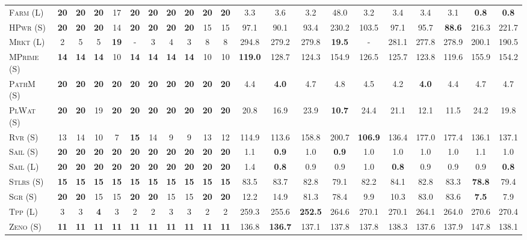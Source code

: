 \documentclass[11pt,landscape]{article}
\begin{document}
\begin{table}[tb]
{\begin{tabular}{|l||cccccccccc||cccccccccc||}
\textsc{Farm} (L)&\textbf{20}&\textbf{20}&\textbf{20}&17&\textbf{20}&\textbf{20}&\textbf{20}&\textbf{20}&\textbf{20}&\textbf{20}&3.3&3.6&3.2&48.0&3.2&3.4&3.4&3.1&\textbf{0.8}&\textbf{0.8}\\
\textsc{HPwr} (S)&\textbf{20}&\textbf{20}&\textbf{20}&14&\textbf{20}&\textbf{20}&\textbf{20}&\textbf{20}&15&15&97.1&90.1&93.4&230.2&103.5&97.1&95.7&\textbf{88.6}&216.3&221.7\\
\textsc{Mrkt} (L)&2&5&5&\textbf{19}&-&3&4&3&8&8&294.8&279.2&279.8&\textbf{19.5}&-&281.1&277.8&278.9&200.1&190.5\\
\textsc{MPrime} (S)&\textbf{14}&\textbf{14}&\textbf{14}&10&\textbf{14}&\textbf{14}&\textbf{14}&\textbf{14}&10&10&\textbf{119.0}&128.7&124.3&154.9&126.5&125.7&123.8&119.6&155.9&154.2\\
\textsc{PathM} (S)&\textbf{20}&\textbf{20}&\textbf{20}&\textbf{20}&\textbf{20}&\textbf{20}&\textbf{20}&\textbf{20}&\textbf{20}&\textbf{20}&4.4&\textbf{4.0}&4.7&4.8&4.5&4.2&\textbf{4.0}&4.4&4.7&4.7\\
\textsc{PlWat} (S)&\textbf{20}&\textbf{20}&19&\textbf{20}&\textbf{20}&\textbf{20}&\textbf{20}&\textbf{20}&\textbf{20}&\textbf{20}&20.8&16.9&23.9&\textbf{10.7}&24.4&21.1&12.1&11.5&24.2&19.8\\
\textsc{Rvr} (S)&13&14&10&7&\textbf{15}&14&9&9&13&12&114.9&113.6&158.8&200.7&\textbf{106.9}&136.4&177.0&177.4&136.1&137.1\\
\textsc{Sail} (S)&\textbf{20}&\textbf{20}&\textbf{20}&\textbf{20}&\textbf{20}&\textbf{20}&\textbf{20}&\textbf{20}&\textbf{20}&\textbf{20}&1.1&\textbf{0.9}&1.0&\textbf{0.9}&1.0&1.0&1.0&1.0&1.1&1.0\\
\textsc{Sail} (L)&\textbf{20}&\textbf{20}&\textbf{20}&\textbf{20}&\textbf{20}&\textbf{20}&\textbf{20}&\textbf{20}&\textbf{20}&\textbf{20}&1.4&\textbf{0.8}&0.9&0.9&1.0&\textbf{0.8}&0.9&0.9&0.9&\textbf{0.8}\\
\textsc{Stlrs} (S)&\textbf{15}&\textbf{15}&\textbf{15}&\textbf{15}&\textbf{15}&\textbf{15}&\textbf{15}&\textbf{15}&\textbf{15}&\textbf{15}&83.5&83.7&82.8&79.1&82.2&84.1&82.8&83.3&\textbf{78.8}&79.4\\
\textsc{Sgr} (S)&\textbf{20}&\textbf{20}&15&15&\textbf{20}&\textbf{20}&15&15&\textbf{20}&\textbf{20}&12.2&14.9&81.3&78.4&9.9&10.3&83.0&83.6&\textbf{7.5}&7.9\\
\textsc{Tpp} (L)&3&3&\textbf{4}&3&2&2&3&3&2&2&259.3&255.6&\textbf{252.5}&264.6&270.1&270.1&264.1&264.0&270.6&270.4\\
\textsc{Zeno} (S)&\textbf{11}&\textbf{11}&\textbf{11}&\textbf{11}&\textbf{11}&\textbf{11}&\textbf{11}&\textbf{11}&\textbf{11}&\textbf{11}&136.8&\textbf{136.7}&137.1&137.8&137.8&138.3&137.6&137.9&147.8&138.1\\

\end{tabular}}
\end{table}
\end{document}
